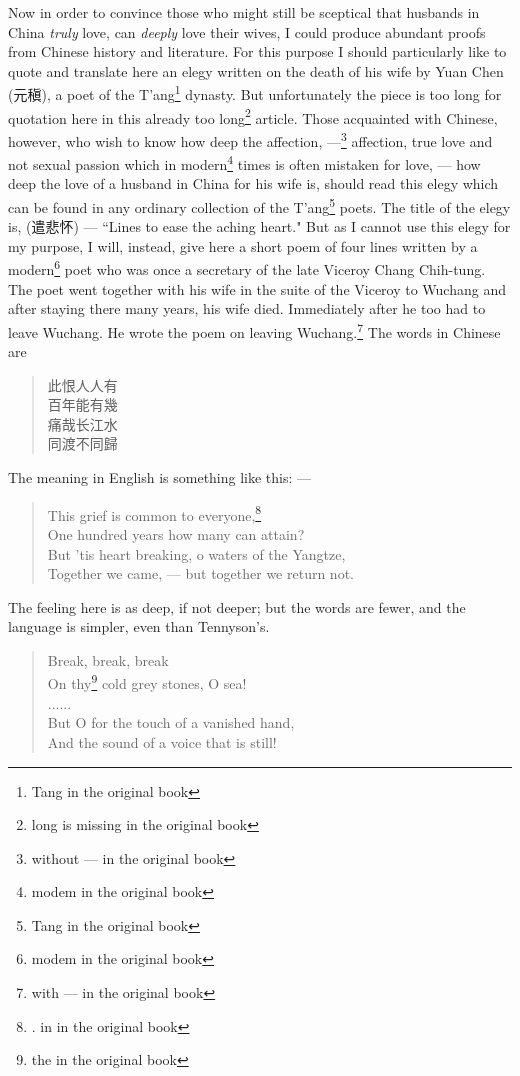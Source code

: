Now in order to convince those who might still be sceptical that husbands in China \emph{truly} love, can \emph{deeply} love their wives, I could produce abundant proofs from Chinese history and literature.
For this purpose I should particularly like to quote and translate here an elegy written on the death of his wife by Yuan Chen (元稹), a poet of the T'ang\footnote{Tang in the original book} dynasty.
But unfortunately the piece is too long for quotation here in this already too long\footnote{long is missing in the original book} article.
Those acquainted with Chinese, however, who wish to know how deep the affection, ---\footnote{without --- in the original book} affection, true love and not sexual passion which in modern\footnote{modem in the original book} times is often mistaken for love, --- how deep the love of a husband in China for his wife is, should read this elegy which can be found in any ordinary collection of the T'ang\footnote{Tang in the original book} poets.
The title of the elegy is, (遣悲怀) --- ``Lines to ease the aching heart." 
But as I cannot use this elegy for my purpose, I will, instead, give here a short poem of four lines written by a modern\footnote{modem in the original book} poet who was once a secretary of the late Viceroy Chang Chih-tung. 
The poet went together with his wife in the suite of the Viceroy to Wuchang and after staying there  many years, his wife died.
Immediately after he too had to leave Wuchang.
He wrote the poem on leaving Wuchang.\footnote{with --- in the original book} 
The words in Chinese are
\begin{quote}\footnotesize
   此恨人人有\\
   百年能有幾\\
   痛哉长江水\\
   同渡不同歸
\end{quote}
The meaning in English is something like this: --- 
\begin{quote}\footnotesize
    This grief is common to everyone,\footnote{. in in the original book}\\
    One hundred years how many can attain?\\
    But 'tis heart breaking, o waters of the Yangtze,\\
    Together we came, --- but together we return not.\\
\end{quote}
The feeling here is as deep, if not deeper; but the words are fewer, and the language is simpler, even than Tennyson's.
\begin{quote}\footnotesize
    Break, break, break\\
    On thy\footnote{the in the original book} cold grey stones, O sea!\\
               ......              \\
    But O for the touch of a vanished hand,\\
    And the sound of a voice that is still!
\end{quote}

